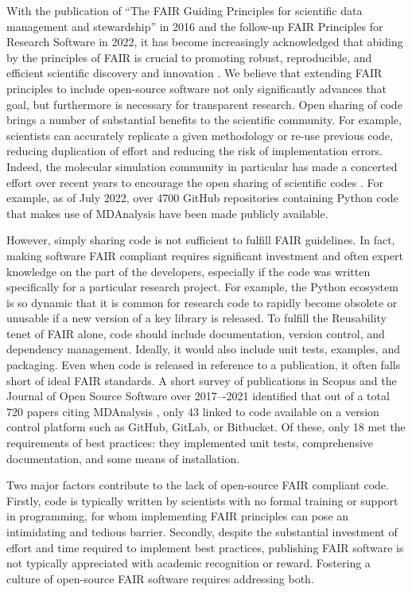 \documentclass[9pt,whitepaper]{livecoms}
\begin{document}
With the publication of “The FAIR Guiding Principles for scientific data management and stewardship” in 2016 and the follow-up FAIR Principles for Research Software in 2022, it has become increasingly acknowledged that abiding by the principles of FAIR is crucial to promoting robust, reproducible, and efficient scientific discovery and innovation  \cite{chue_hong_fair_2021, wilkinson_fair_2016}. We believe that extending FAIR principles to include open-source software not only significantly advances that goal, but furthermore is necessary for transparent research. Open sharing of code brings a number of substantial benefits to the scientific community. For example, scientists can accurately replicate a given methodology or re-use previous code, reducing duplication of effort and reducing the risk of implementation errors. Indeed, the molecular simulation community in particular has made a concerted effort over recent years to encourage the open sharing of scientific codes \cite{walters_code_2020}. For example, as of July 2022, over 4700 GitHub repositories containing Python code that makes use of MDAnalysis \cite{michaud-agrawal_mdanalysis_2011, gowers_mdanalysis_2016} have been made publicly available.

However, simply sharing code is not sufficient to fulfill FAIR guidelines. In fact, making software FAIR compliant requires significant investment and often expert knowledge on the part of the developers, especially if the code was written specifically for a particular research project. For example, the Python ecosystem is so dynamic that it is common for research code to rapidly become obsolete or unusable if a new version of a key library is released. To fulfill the Reusability tenet of FAIR alone, code should include documentation, version control, and dependency management. Ideally, it would also include unit tests, examples, and packaging. Even when code is released in reference to a publication, it often falls short of ideal FAIR standards. A short survey of publications in Scopus \cite{noauthor_scopus_nodate} and the Journal of Open Source Software \cite{noauthor_journal_nodate} over 2017–-2021 identified that out of a total 720 papers citing MDAnalysis \cite{michaud-agrawal_mdanalysis_2011, gowers_mdanalysis_2016}, only 43 linked to code available on a version control platform such as GitHub, GitLab, or Bitbucket. Of these, only 18 met the requirements of best practices: they implemented unit tests, comprehensive documentation, and some means of installation.

Two major factors contribute to the lack of open-source FAIR compliant code. Firstly, code is typically written by scientists with no formal training or support in programming, for whom implementing FAIR principles can pose an intimidating and tedious barrier. Secondly, despite the substantial investment of effort and time required to implement best practices, publishing FAIR software is not typically appreciated with academic recognition or reward. Fostering a culture of open-source FAIR software requires addressing both.
\end{document}
